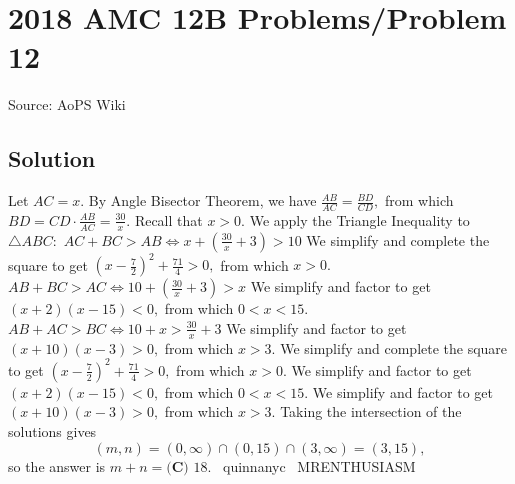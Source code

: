 \documentclass[12pt]{article}
\begin{document}
\section*{{2018 AMC 12B Problems/Problem 12}}
Source: AoPS Wiki

\subsection*{Solution}
Let $AC=x.$ By Angle Bisector Theorem, we have $\frac{AB}{AC}=\frac{BD}{CD},$ from which $BD=CD\cdot\frac{AB}{AC}=\frac{30}{x}.$ Recall that $x>0.$ We apply the Triangle Inequality to $\triangle ABC:$ $AC+BC>AB \iff x+\left(\frac{30}{x}+3\right)>10$ We simplify and complete the square to get $\left(x-\frac72\right)^2+\frac{71}{4}>0,$ from which $x>0.$ $AB+BC>AC \iff 10+\left(\frac{30}{x}+3\right)>x$ We simplify and factor to get $(x+2)(x-15)<0,$ from which $0<x<15.$ $AB+AC>BC \iff 10+x>\frac{30}{x}+3$ We simplify and factor to get $(x+10)(x-3)>0,$ from which $x>3.$ We simplify and complete the square to get $\left(x-\frac72\right)^2+\frac{71}{4}>0,$ from which $x>0.$ We simplify and factor to get $(x+2)(x-15)<0,$ from which $0<x<15.$ We simplify and factor to get $(x+10)(x-3)>0,$ from which $x>3.$ Taking the intersection of the solutions gives \[(m,n)=(0,\infty)\cap(0,15)\cap(3,\infty)=(3,15),\] so the answer is $m+n=\boxed{\textbf{(C) }18}.$ ~quinnanyc ~MRENTHUSIASM
\end{document}
